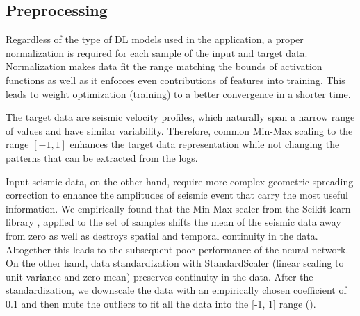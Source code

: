 \documentclass[paper,twocolomn]{geophysics}
\begin{document}
\subsection{Preprocessing}
Regardless of the type of DL models used in the application, a proper normalization is required for each sample of the input and target data. Normalization makes data fit the range matching the bounds of activation functions as well as it enforces even contributions of features into training. This leads to weight optimization (training) to a better convergence in a shorter time.


The target data are seismic velocity profiles, which naturally span a narrow range of values and have similar variability. Therefore, common Min-Max scaling to the range $[-1, 1]$ enhances the target data representation while not changing the patterns that can be extracted from the logs.  

Input seismic data, on the other hand, require more complex geometric spreading correction to enhance the amplitudes of seismic event that carry the most useful information.
%
We empirically found that the Min-Max scaler from the Scikit-learn library \citep{scikit-learn}, applied to the set of samples shifts the mean of the seismic data away from zero as well as destroys spatial and temporal continuity in the data. Altogether this leads to the subsequent poor performance of the neural network. On the other hand, data standardization with StandardScaler (linear scaling to unit variance and zero mean) preserves continuity in the data. After the standardization, we downscale the data with an empirically chosen coefficient of 0.1 and then mute the outliers to fit all the data into the [-1, 1] range ().

%
\end{document}
